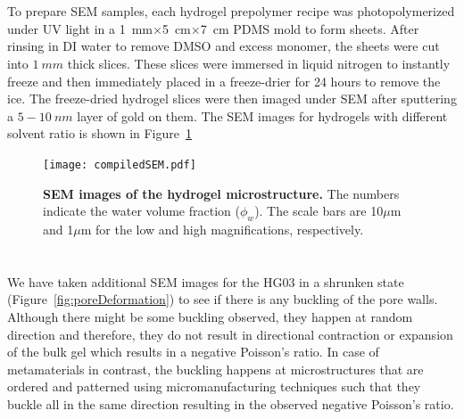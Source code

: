 \section{}
To prepare SEM samples, each hydrogel prepolymer recipe was photopolymerized under UV light in a 1~mm$\times$5~cm$\times$7~cm PDMS mold to form sheets. After rinsing in DI water to remove DMSO and excess monomer, the sheets were cut into $1~mm$ thick slices. These slices were immersed in liquid nitrogen to instantly freeze and then immediately placed in a freeze-drier for 24 hours to remove the ice. The freeze-dried hydrogel slices were then imaged under SEM after sputtering a $5-10~nm$ layer of gold on them. The SEM images for hydrogels with different solvent ratio is shown in Figure~\ref{fig:compiledSEM}

\begin{figure}[!th]
      \centering
      \texttt{[image: compiledSEM.pdf]}
      \caption[]{\textbf{SEM images of the hydrogel microstructure.} The numbers indicate the water volume fraction ($\phi_w$). The scale bars are 10$\mu$m and 1$\mu$m for the low and high magnifications, respectively.}
      \label{fig:compiledSEM}
\end{figure}

\section{}
We have taken additional SEM images for the HG03 in a shrunken state (Figure~\ref{fig:poreDeformation}) to see if there is any buckling of the pore walls. Although there might be some buckling observed, they happen at random direction and therefore, they do not result in directional contraction or expansion of the bulk gel which results in a negative Poisson’s ratio. In case of metamaterials in contrast, the buckling happens at microstructures that are ordered and patterned using micromanufacturing techniques such that they buckle all in the same direction resulting in the observed negative Poisson’s ratio.

